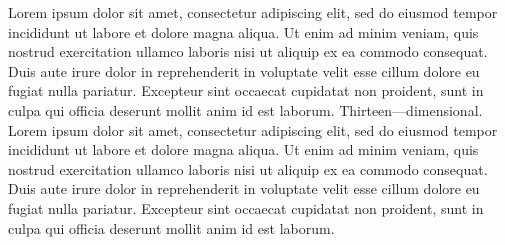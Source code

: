 


\hfuzz=10000pt \hsize=7.29cm
\noindent Lorem ipsum dolor sit amet, consectetur adipiscing elit, sed do
eiusmod tempor incididunt ut labore et dolore magna aliqua. Ut enim ad minim
veniam, quis nostrud exercitation ullamco laboris nisi ut aliquip ex ea commodo
consequat. Duis aute irure dolor in reprehenderit in voluptate velit esse cillum
dolore eu fugiat nulla pariatur. Excepteur sint occaecat cupidatat non proident,
sunt in culpa qui officia deserunt mollit anim id est laborum.
Thirteen\nobreak\space---\nobreak\space dimensional.
Lorem ipsum dolor sit amet, consectetur adipiscing elit, sed do eiusmod tempor
incididunt ut labore et dolore magna aliqua. Ut enim ad minim veniam, quis
nostrud exercitation ullamco laboris nisi ut aliquip ex ea commodo consequat.
Duis aute irure dolor in reprehenderit in voluptate velit esse cillum dolore eu
fugiat nulla pariatur. Excepteur sint occaecat cupidatat non proident, sunt in
culpa qui officia deserunt mollit anim id est laborum.
\bye
